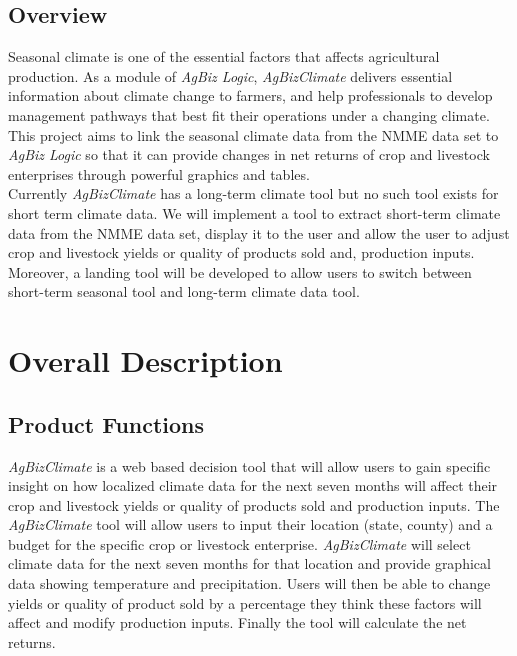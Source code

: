 \documentclass[onecolumn, draftclsnofoot,10pt, compsoc]{article}
\begin{document}
		\nocite{*}
    
    


		\subsection{Overview}
			Seasonal climate is one of the essential factors that affects agricultural production. As a module of \textit{AgBiz Logic}, \textit{AgBizClimate} delivers essential information about climate change to farmers, and help professionals to develop management pathways that best fit their operations under a changing climate. This project aims to link the seasonal climate data from the NMME data set to \textit{AgBiz Logic} so that it can provide changes in net returns of crop and livestock enterprises through powerful graphics and tables. \\
			Currently \textit{AgBizClimate} has a long-term climate tool but no such tool exists for short term climate data. We will implement a tool to extract short-term climate data from the NMME data set, display it to the user and allow the user to adjust crop and livestock yields or quality of products sold and, production inputs. Moreover, a landing tool will be developed to allow users to switch between short-term seasonal tool and long-term climate data tool.\\
\section{Overall Description}
	\subsection {Product Functions}
				\textit{AgBizClimate} is a web based decision tool that will allow users to gain specific insight on how localized climate data for the next seven months will affect their crop and livestock yields or quality of products sold and production inputs. The \textit{AgBizClimate} tool will allow users to input their location (state, county) and a budget for the specific crop or livestock enterprise. \textit{AgBizClimate} will select climate data for the next seven months for that location and provide graphical data showing temperature and precipitation. Users will then be able to change yields or quality of product sold by a percentage they think these factors will affect and modify production inputs. Finally the tool will calculate the net returns.\\
\end{document}
